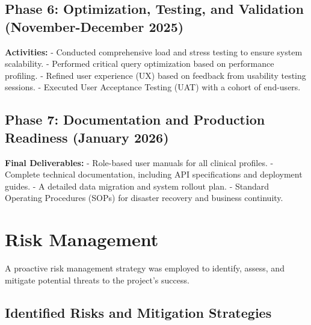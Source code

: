 \subsection{Phase 6: Optimization, Testing, and Validation (November-December 2025)}

\textbf{Activities:}
- Conducted comprehensive load and stress testing to ensure system scalability.
- Performed critical query optimization based on performance profiling.
- Refined user experience (UX) based on feedback from usability testing sessions.
- Executed User Acceptance Testing (UAT) with a cohort of end-users.

\subsection{Phase 7: Documentation and Production Readiness (January 2026)}

\textbf{Final Deliverables:}
- Role-based user manuals for all clinical profiles.
- Complete technical documentation, including API specifications and deployment guides.
- A detailed data migration and system rollout plan.
- Standard Operating Procedures (SOPs) for disaster recovery and business continuity.

\section{Risk Management}

A proactive risk management strategy was employed to identify, assess, and mitigate potential threats to the project's success.

\subsection{Identified Risks and Mitigation Strategies}

